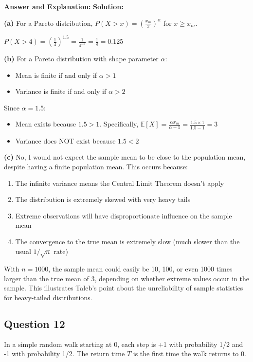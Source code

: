 \documentclass[11pt]{article}
\newenvironment{answer}{\color{answercolor}\begin{framed}\textbf{Answer and Explanation:}}{\end{framed}}
\begin{document}
\begin{answer}
\textbf{Solution:}

\textbf{(a)} For a Pareto distribution, $P(X > x) = \left(\frac{x_m}{x}\right)^\alpha$ for $x \geq x_m$.

$P(X > 4) = \left(\frac{1}{4}\right)^{1.5} = \frac{1}{4^{1.5}} = \frac{1}{8} = 0.125$

\textbf{(b)} For a Pareto distribution with shape parameter $\alpha$:
\begin{itemize}
    \item Mean is finite if and only if $\alpha > 1$
    \item Variance is finite if and only if $\alpha > 2$
\end{itemize}

Since $\alpha = 1.5$:
\begin{itemize}
    \item Mean exists because $1.5 > 1$. Specifically, $\mathbb{E}[X] = \frac{\alpha x_m}{\alpha - 1} = \frac{1.5 \times 1}{1.5 - 1} = 3$
    \item Variance does NOT exist because $1.5 < 2$
\end{itemize}

\textbf{(c)} No, I would not expect the sample mean to be close to the population mean, despite having a finite population mean. This occurs because:

\begin{enumerate}
    \item The infinite variance means the Central Limit Theorem doesn't apply
    \item The distribution is extremely skewed with very heavy tails
    \item Extreme observations will have disproportionate influence on the sample mean
    \item The convergence to the true mean is extremely slow (much slower than the usual $1/\sqrt{n}$ rate)
\end{enumerate}

With $n = 1000$, the sample mean could easily be 10, 100, or even 1000 times larger than the true mean of 3, depending on whether extreme values occur in the sample. This illustrates Taleb's point about the unreliability of sample statistics for heavy-tailed distributions.
\end{answer}

\subsection{Question 12}
In a simple random walk starting at 0, each step is +1 with probability 1/2 and -1 with probability 1/2. The return time $T$ is the first time the walk returns to 0.
\end{document}
